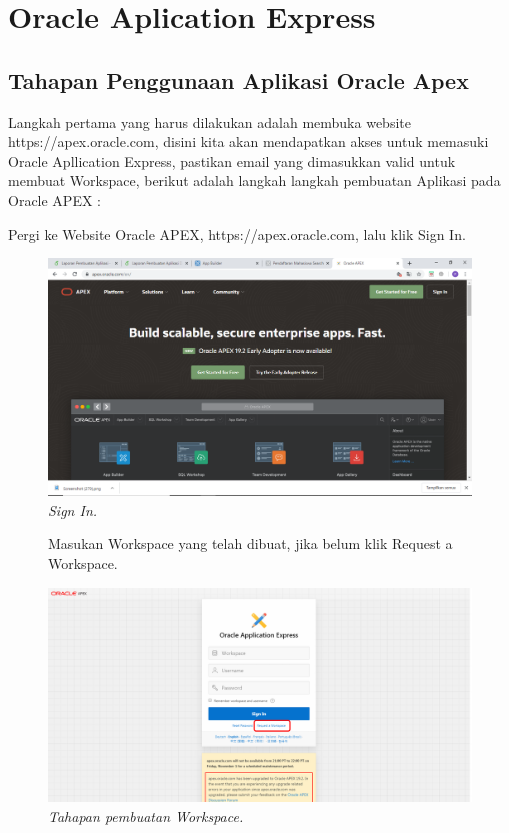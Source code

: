 \chapter{Oracle Aplication Express}

\section{Tahapan Penggunaan Aplikasi Oracle Apex}
Langkah pertama yang harus dilakukan adalah membuka website https://apex.oracle.com, disini kita akan mendapatkan akses untuk memasuki Oracle Apllication Express, pastikan email yang dimasukkan valid untuk membuat Workspace, berikut adalah langkah langkah pembuatan Aplikasi pada Oracle APEX :

\begin{enumerate}
\item[1]Pergi ke Website Oracle APEX, https://apex.oracle.com, lalu klik Sign In.
\begin{figure}[!htbp]
    \begin{center}
    \includegraphics[scale=0.2]{figures/14.png}
    \caption{\textit{Sign In.}}
    \end{center}   
\end{figure} 
   
\begin{figure}[!htbp]
\item[2]Masukan Workspace yang telah dibuat, jika belum klik Request a Workspace.
    \begin{center}
    \includegraphics[scale=0.2]{figures/tahap1.png}
    \caption{\textit{Tahapan pembuatan Workspace.}}
    \end{center}
\end{figure}


\end{enumerate}
